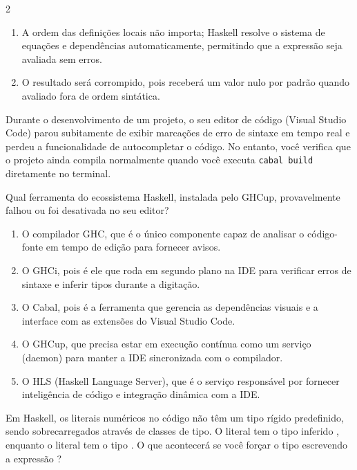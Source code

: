 \documentclass[a4paper,10pt,brazil]{article}
\begin{document}
\begin{multicols}{2}
\begin{enumerate}
  \item A ordem das definições locais não importa; Haskell resolve o sistema de equações e dependências automaticamente, permitindo que a expressão seja avaliada sem erros.

  \item O resultado será corrompido, pois  receberá um valor nulo por padrão quando avaliado fora de ordem sintática.


\end{enumerate}

Durante o desenvolvimento de um projeto, o seu editor de código (Visual Studio Code) parou subitamente de exibir marcações de erro de sintaxe em tempo real e perdeu a funcionalidade de autocompletar o código. No entanto, você verifica que o projeto ainda compila normalmente quando você executa \texttt{cabal build} diretamente no terminal. 

Qual ferramenta do ecossistema Haskell, instalada pelo GHCup, provavelmente falhou ou foi desativada no seu editor?

\begin{enumerate}
  \item O compilador GHC, que é o único componente capaz de analisar o código-fonte em tempo de edição para fornecer avisos.

  \item O GHCi, pois é ele que roda em segundo plano na IDE para verificar erros de sintaxe e inferir tipos durante a digitação.

  \item O Cabal, pois é a ferramenta que gerencia as dependências visuais e a interface com as extensões do Visual Studio Code.

  \item O GHCup, que precisa estar em execução contínua como um serviço (daemon) para manter a IDE sincronizada com o compilador.

  \item O HLS (Haskell Language Server), que é o serviço responsável por fornecer inteligência de código e integração dinâmica com a IDE.


\end{enumerate}

Em Haskell, os literais numéricos no código não têm um tipo rígido predefinido, sendo sobrecarregados através de classes de tipo. O literal  tem o tipo inferido , enquanto o literal  tem o tipo . 
O que acontecerá se você forçar o tipo escrevendo a expressão ?


\end{multicols}
\end{document}

